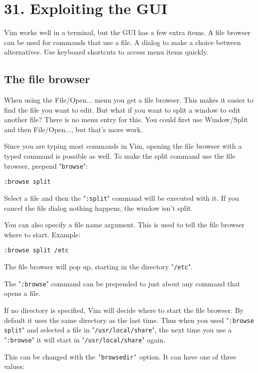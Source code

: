 \section{31. Exploiting the GUI}
Vim works well in a terminal, but the GUI has a few extra items.  A file
browser can be used for commands that use a file.  A dialog to make a choice
between alternatives.  Use keyboard shortcuts to access menu items quickly.
\subsection{The file browser}
When using the File/Open... menu you get a file browser.
This makes it easier to find the file you want to edit.
But what if you want to split a window to edit another file?  There is no menu entry for this.
You could first use Window/Split and then File/Open..., but that's more work.

Since you are typing most commands in Vim, opening the file browser with a typed command is possible as well.
To make the split command use the file browser, prepend "\texttt{browse}":

\begin{Verbatim}[samepage=true]
 :browse split
\end{Verbatim}

Select a file and then the "\texttt{:split}" command will be executed with it.
If you cancel the file dialog nothing happens, the window isn't split.

You can also specify a file name argument.
This is used to tell the file browser where to start.
Example:

\begin{Verbatim}[samepage=true]
 :browse split /etc
\end{Verbatim}

The file browser will pop up, starting in the directory "\texttt{/etc}".

The "\texttt{:browse}" command can be prepended to just about any command that opens a file.

If no directory is specified, Vim will decide where to start the file browser.
By default it uses the same directory as the last time.
Thus when you used "\texttt{:browse split}" and selected a file in "\texttt{/usr/local/share}", the next time you use a "\texttt{:browse}" it will start in "\texttt{/usr/local/share}" again.

This can be changed with the \texttt{'browsedir'} option.  It can have one of three values:

